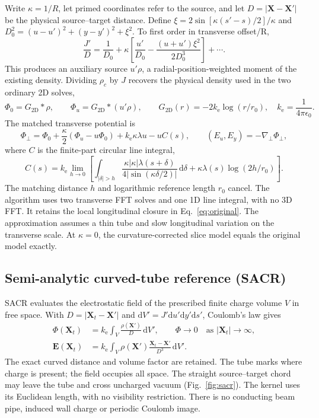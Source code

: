 \documentclass[10pt,a4paper]{article}
\newcommand{\dd}{\mathrm d}
\newcommand{\eps}{\epsilon_0}
\newcommand{\kC}{k_{\mathrm e}}
\begin{document}
Write $\kappa=1/R$, let primed coordinates refer to the source, and let
$D=|\mathbf X-\mathbf X'|$ be the physical source--target distance. Define
$\xi=2\sin[\kappa(s'-s)/2]/\kappa$ and
$D_0^2=(u-u')^2+(y-y')^2+\xi^2$. To first order in transverse offset/R,
\begin{equation}
 \frac{J'}{D}=\frac{1}{D_0}+\kappa\left[
 \frac{u'}{D_0}-\frac{(u+u')\xi^2}{2D_0^3}\right]+\cdots.
 \label{eq:expansion}
\end{equation}
This produces an auxiliary source $u'\rho$, a radial-position-weighted
moment of the existing density. Dividing $\rho_c$ by $J$ recovers the
physical density used in the two ordinary 2D solves,
\begin{equation}
 \Phi_0=G_{2\mathrm D}*\rho,\qquad
 \Phi_u=G_{2\mathrm D}*(u'\rho),\qquad
 G_{2\mathrm D}(r)=-2\kC\log(r/r_0),\quad
 \kC=\frac{1}{4\pi\eps}.
\end{equation}
The matched transverse potential is
\begin{equation}
 \Phi_\perp=\Phi_0+\frac{\kappa}{2}(\Phi_u-u\Phi_0)
                  +\kC\kappa\lambda u-uC(s),\qquad
 (E_u,E_y)=-\nabla_\perp\Phi_\perp,
 \label{eq:correction}
\end{equation}
where $C$ is the finite-part circular line integral,
\begin{equation}
 C(s)=\kC\lim_{h\to0}\left[
 \int_{|\delta|>h}\frac{\kappa|\kappa|\lambda(s+\delta)}
 {4|\sin(\kappa\delta/2)|}\,\dd\delta
 +\kappa\lambda(s)\log(2h/r_0)\right].
 \label{eq:line}
\end{equation}
The matching distance $h$ and logarithmic reference length $r_0$ cancel.
The algorithm uses two transverse FFT solves and one 1D line integral,
with no 3D FFT. It retains the local longitudinal closure in
Eq.~\eqref{eq:original}. The approximation assumes a thin tube and slow
longitudinal variation on the transverse scale. At $\kappa=0$, the
curvature-corrected slice model equals the original model exactly.

\subsection{Semi-analytic curved-tube reference (SACR)}
SACR evaluates the electrostatic field of the prescribed finite charge
volume $V$ in free space. With $D=|\mathbf X_t-\mathbf X'|$ and
$\dd V'=J'\dd u'\dd y'\dd s'$, Coulomb's law gives
\begin{align}
 \Phi(\mathbf X_t)&=\kC\int_V\frac{\rho(\mathbf X')}{D}\,\dd V',
 \qquad \Phi\to0\quad\text{as }|\mathbf X_t|\to\infty,\\
 \mathbf E(\mathbf X_t)&=\kC\int_V\rho(\mathbf X')
 \frac{\mathbf X_t-\mathbf X'}{D^3}\,\dd V'.
 \label{eq:sacr}
\end{align}
The exact curved distance and volume factor are retained. The tube marks
where charge is present; the field occupies all space. The straight
source--target chord may leave the tube and cross uncharged vacuum
(Fig.~\ref{fig:sacr}). The kernel uses its Euclidean length, with no
visibility restriction. There is no conducting beam pipe, induced wall
charge or periodic Coulomb image.
\end{document}
